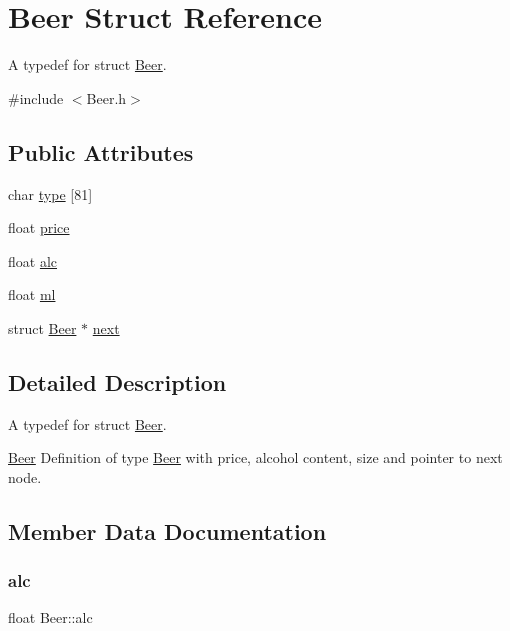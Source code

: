\hypertarget{struct_beer}{}\section{Beer Struct Reference}
\label{struct_beer}


A typedef for struct \mbox{\hyperlink{struct_beer}{Beer}}.  




{\ttfamily \#include $<$Beer.\+h$>$}

\subsection*{Public Attributes}
\begin{DoxyCompactItemize}
\item 
char \mbox{\hyperlink{struct_beer_a5176807d2dc4b1e3ccfb62a047c417a1}{type}} \mbox{[}81\mbox{]}
\item 
float \mbox{\hyperlink{struct_beer_a3350ff6d199f1d9e9cd4b751fb7659bd}{price}}
\item 
float \mbox{\hyperlink{struct_beer_aebd5a7f15f5c04f3b50447acbc1a3df9}{alc}}
\item 
float \mbox{\hyperlink{struct_beer_a5b628ad8c8ee212136436edc03085680}{ml}}
\item 
struct \mbox{\hyperlink{struct_beer}{Beer}} $\ast$ \mbox{\hyperlink{struct_beer_a02344d6caf206b3530ac86f92e2a91d1}{next}}
\end{DoxyCompactItemize}


\subsection{Detailed Description}
A typedef for struct \mbox{\hyperlink{struct_beer}{Beer}}. 

\mbox{\hyperlink{struct_beer}{Beer}} Definition of type \mbox{\hyperlink{struct_beer}{Beer}} with price, alcohol content, size and pointer to next node. 

\subsection{Member Data Documentation}
\mbox{\label{struct_beer_aebd5a7f15f5c04f3b50447acbc1a3df9}} 
\subsubsection{\texorpdfstring{alc}{alc}}
{\footnotesize\ttfamily float Beer\+::alc}

